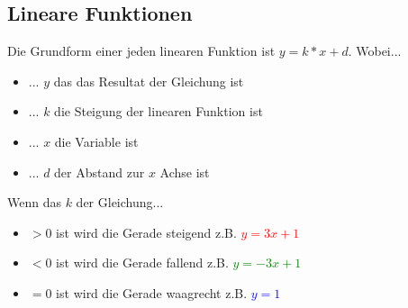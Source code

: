 \newpage
\subsection{Lineare Funktionen}

Die Grundform einer jeden linearen Funktion ist $y=k*x+d$.
Wobei...

\begin{itemize}
    \item ... $y$ das das Resultat der Gleichung ist
    \item ... $k$ die Steigung der linearen Funktion ist
    \item ... $x$ die Variable ist
    \item ... $d$ der Abstand zur $x$ Achse ist
\end{itemize}

\hfill \break
Wenn das $k$ der Gleichung...
\begin{itemize}
    \item $>0$ ist wird die Gerade steigend z.B. \textcolor{red}{$y=3x+1$}
    \item $<0$ ist wird die Gerade fallend z.B. \textcolor{green}{$y=-3x+1$}
    \item $=0$ ist wird die Gerade waagrecht z.B. \textcolor{blue}{$y=1$}
\end{itemize}

\hfill \break
{}